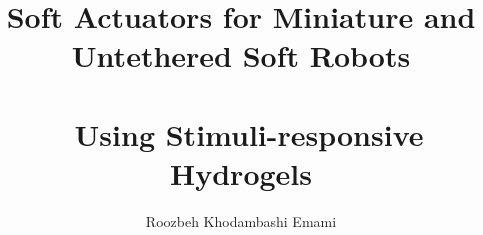 \documentclass[12pt,letterpaper]{report}
\begin{document}
\title{Soft Actuators for Miniature and Untethered Soft Robots\\\\\ Using Stimuli-responsive Hydrogels}
\author{Roozbeh Khodambashi Emami}
\maketitle

\doublespace

%
\tableofcontents
\newpage

%
%

\end{document}
